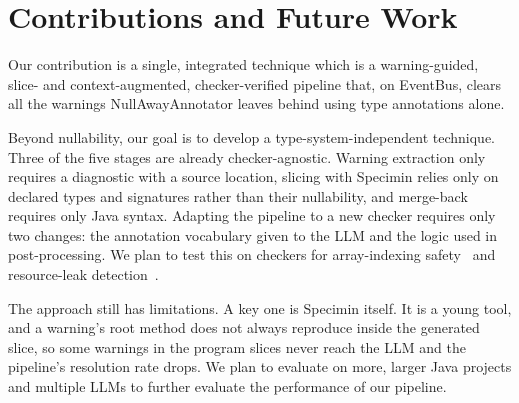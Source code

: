 \documentclass[sigplan,screen]{acmart}
\begin{document}
\section{Contributions and Future Work}

Our contribution is a single, integrated technique which is a warning-guided, slice- and context-augmented, checker-verified pipeline that, on EventBus, clears all the warnings NullAwayAnnotator leaves behind using type annotations alone.

Beyond nullability, our goal is to develop a type-system-independent technique. Three of the five stages are already checker-agnostic. Warning extraction only requires a diagnostic with a source location, slicing with Specimin relies only on declared types and signatures rather than their nullability, and merge-back requires only Java syntax. Adapting the pipeline to a new checker requires only two changes: the annotation vocabulary given to the LLM and the logic used in post-processing. We plan to test this on checkers for array-indexing safety~\cite{kellogg2018lightweight} and resource-leak detection~\cite{kellogg2021lightweight}.

The approach still has limitations. A key one is Specimin itself. It is a young tool, and a warning's root method does not always reproduce inside the generated slice, so some warnings in the program slices never reach the LLM and the pipeline's resolution rate drops. We plan to evaluate on more, larger Java projects and multiple LLMs to further evaluate the performance of our pipeline. 



\end{document}
